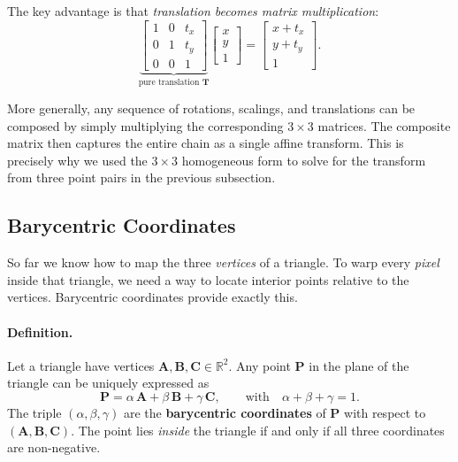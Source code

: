 The key advantage is that \emph{translation becomes matrix multiplication}:
\[
    \underbrace{
    \begin{bmatrix}
        1 & 0 & t_x \\
        0 & 1 & t_y \\
        0 & 0 & 1
    \end{bmatrix}}_{\text{pure translation } \mathbf{T}}
    \begin{bmatrix} x \\ y \\ 1 \end{bmatrix}
    =
    \begin{bmatrix} x + t_x \\ y + t_y \\ 1 \end{bmatrix}.
\]

More generally, any sequence of rotations, scalings, and translations can be composed by simply multiplying the corresponding $3\times3$ matrices.  The composite matrix then captures the entire chain as a single affine transform.  This is precisely why we used the $3\times3$ homogeneous form to solve for the transform from three point pairs in the previous subsection.

\subsection{Barycentric Coordinates}

So far we know how to map the three \emph{vertices} of a triangle.  To warp every \emph{pixel} inside that triangle, we need a way to locate interior points relative to the vertices.  Barycentric coordinates provide exactly this.

\paragraph{Definition.}
Let a triangle have vertices $\mathbf{A}, \mathbf{B}, \mathbf{C} \in \mathbb{R}^2$.  Any point $\mathbf{P}$ in the plane of the triangle can be uniquely expressed as
\[
    \mathbf{P} = \alpha\,\mathbf{A} + \beta\,\mathbf{B} + \gamma\,\mathbf{C},
    \qquad \text{with} \quad \alpha + \beta + \gamma = 1.
\]
The triple $(\alpha, \beta, \gamma)$ are the \textbf{barycentric coordinates} of $\mathbf{P}$ with respect to $(\mathbf{A}, \mathbf{B}, \mathbf{C})$.  The point lies \emph{inside} the triangle if and only if all three coordinates are non-negative.

